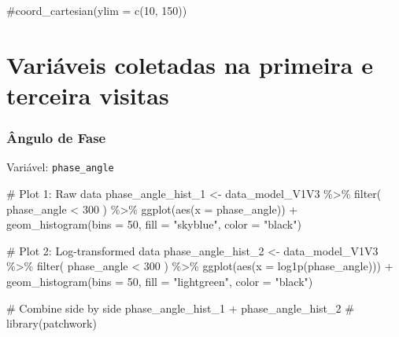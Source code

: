 \documentclass[
  letterpaper,
  DIV=11,
  numbers=noendperiod]{scrartcl}
\newenvironment{Shaded}{\begin{snugshade}}{\end{snugshade}}
\newcommand{\AttributeTok}[1]{\textcolor[rgb]{0.40,0.45,0.13}{#1}}
\newcommand{\CommentTok}[1]{\textcolor[rgb]{0.37,0.37,0.37}{#1}}
\newcommand{\DecValTok}[1]{\textcolor[rgb]{0.68,0.00,0.00}{#1}}
\newcommand{\FunctionTok}[1]{\textcolor[rgb]{0.28,0.35,0.67}{#1}}
\newcommand{\NormalTok}[1]{\textcolor[rgb]{0.00,0.23,0.31}{#1}}
\newcommand{\OtherTok}[1]{\textcolor[rgb]{0.00,0.23,0.31}{#1}}
\newcommand{\SpecialCharTok}[1]{\textcolor[rgb]{0.37,0.37,0.37}{#1}}
\newcommand{\StringTok}[1]{\textcolor[rgb]{0.13,0.47,0.30}{#1}}
\begin{document}
\begin{Shaded}
\begin{Highlighting}[]
    \CommentTok{\#coord\_cartesian(ylim = c(10, 150))}
\end{Highlighting}
\end{Shaded}

\section{Variáveis coletadas na primeira e terceira
visitas}\label{variuxe1veis-coletadas-na-primeira-e-terceira-visitas}

\subsubsection{Ângulo de Fase}\label{uxe2ngulo-de-fase}

Variável: \texttt{phase\_angle}

\begin{Shaded}
\begin{Highlighting}[]
\CommentTok{\# Plot 1: Raw data}
\NormalTok{phase\_angle\_hist\_1 }\OtherTok{\textless{}{-}}\NormalTok{ data\_model\_V1V3 }\SpecialCharTok{\%\textgreater{}\%} 
    \FunctionTok{filter}\NormalTok{(}
\NormalTok{        phase\_angle }\SpecialCharTok{\textless{}} \DecValTok{300}
\NormalTok{    ) }\SpecialCharTok{\%\textgreater{}\%} 
    \FunctionTok{ggplot}\NormalTok{(}\FunctionTok{aes}\NormalTok{(}\AttributeTok{x =}\NormalTok{ phase\_angle)) }\SpecialCharTok{+} 
    \FunctionTok{geom\_histogram}\NormalTok{(}\AttributeTok{bins =} \DecValTok{50}\NormalTok{, }\AttributeTok{fill =} \StringTok{"skyblue"}\NormalTok{, }\AttributeTok{color =} \StringTok{"black"}\NormalTok{)}

\CommentTok{\# Plot 2: Log{-}transformed data}
\NormalTok{phase\_angle\_hist\_2 }\OtherTok{\textless{}{-}}\NormalTok{ data\_model\_V1V3 }\SpecialCharTok{\%\textgreater{}\%} 
    \FunctionTok{filter}\NormalTok{(}
\NormalTok{        phase\_angle }\SpecialCharTok{\textless{}} \DecValTok{300}
\NormalTok{    ) }\SpecialCharTok{\%\textgreater{}\%}
    \FunctionTok{ggplot}\NormalTok{(}\FunctionTok{aes}\NormalTok{(}\AttributeTok{x =} \FunctionTok{log1p}\NormalTok{(phase\_angle))) }\SpecialCharTok{+} 
    \FunctionTok{geom\_histogram}\NormalTok{(}\AttributeTok{bins =} \DecValTok{50}\NormalTok{, }\AttributeTok{fill =} \StringTok{"lightgreen"}\NormalTok{, }\AttributeTok{color =} \StringTok{"black"}\NormalTok{)}

\CommentTok{\# Combine side by side}
\NormalTok{phase\_angle\_hist\_1 }\SpecialCharTok{+}\NormalTok{ phase\_angle\_hist\_2 }\CommentTok{\# library(patchwork)}
\end{Highlighting}
\end{Shaded}
\end{document}
